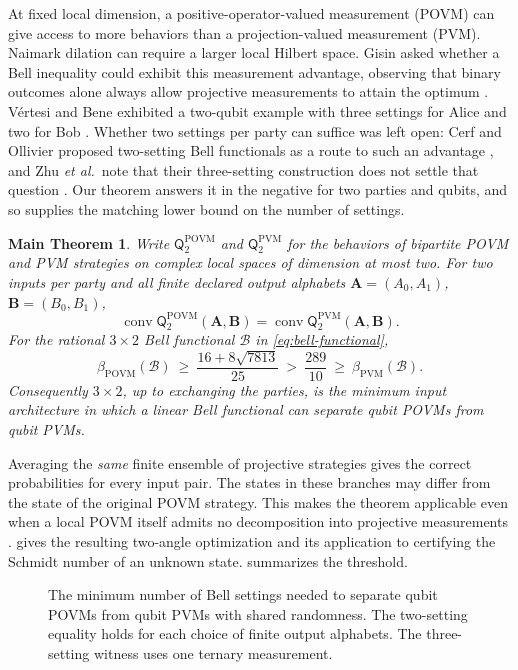\documentclass[11pt]{article}
\newtheorem*{maintheorem}{Main Theorem}
\theoremstyle{definition}
\newcommand{\conv}{\operatorname{conv}}
\newcommand{\Qset}{\mathsf Q}
\newcommand{\POVM}{\mathrm{POVM}}
\newcommand{\PVM}{\mathrm{PVM}}
\newcommand{\Bell}{\mathcal B}
\begin{document}
At fixed local dimension, a positive-operator-valued measurement (POVM) can
give access to more behaviors than a projection-valued measurement (PVM).
Naimark dilation can require a larger local Hilbert space. Gisin asked
whether a Bell inequality could exhibit this measurement advantage, observing
that binary outcomes alone always allow projective measurements to attain
the optimum \cite{gisin2007,cleve2004,liang2007}. V\'ertesi and Bene
exhibited a two-qubit example with three settings for Alice and two for Bob
\cite{vertesi2010}. Whether two settings per party can suffice was left
open: Cerf and Ollivier proposed two-setting Bell functionals as a route to
such an advantage \cite{cerf2026}, and Zhu \emph{et al.}\ note that their
three-setting construction does not settle that question \cite{zhu2026}.
Our theorem answers it in the negative for two parties and qubits, and so
supplies the matching lower bound on the number of settings.

\begin{maintheorem}
Write \(\Qset^{\POVM}_2\) and \(\Qset^{\PVM}_2\) for the behaviors
of bipartite POVM and PVM strategies on complex local spaces of dimension
at most two. For two inputs per party and all finite declared output
alphabets \(\mathbf A=(A_0,A_1)\), \(\mathbf B=(B_0,B_1)\),
\[
\conv\Qset^{\POVM}_2(\mathbf A,\mathbf B)
=
\conv\Qset^{\PVM}_2(\mathbf A,\mathbf B).
\]
For the rational \(3\times2\) Bell functional \(\Bell\) in
\eqref{eq:bell-functional},
\[
\beta_{\POVM}(\Bell)\ \ge\ \frac{16+8\sqrt{7813}}{25}
\ >\ \frac{289}{10}\ \ge\ \beta_{\PVM}(\Bell).
\]
Consequently \(3\times2\), up to exchanging the parties, is the minimum
input architecture in which a linear Bell functional can separate qubit
POVMs from qubit PVMs.
\end{maintheorem}

Averaging the \emph{same} finite ensemble of projective strategies gives
the correct probabilities for every input pair. The states in these
branches may differ from the state of the original POVM strategy.
This makes the theorem applicable even when a local POVM itself admits
no decomposition into projective measurements
\cite{oszmaniec2017,guerini2017,kotowski2026,brinster2026}.
 gives the resulting two-angle optimization
and its application to certifying the Schmidt number of an unknown state.
 summarizes the threshold.

\begin{figure}[!ht]
\centering

\caption{The minimum number of Bell settings needed to separate qubit POVMs
from qubit PVMs with shared randomness. The two-setting equality holds for
each choice of finite output alphabets. The three-setting witness uses one
ternary measurement.}
\label{fig:threshold}
\end{figure}
\end{document}
